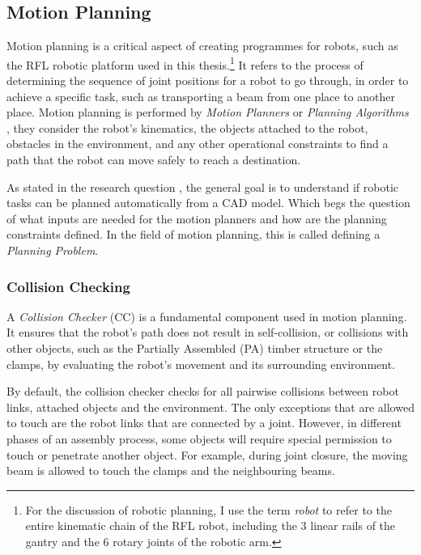 \subsection{Motion Planning}
\label{subsection:exploration-2-motion-planning}

Motion planning is a critical aspect of creating programmes for robots, such as the RFL robotic platform used in this thesis.\footnote{For the discussion of robotic planning, I use the term \textit{robot} to refer to the entire kinematic chain of the RFL robot, including the 3 linear rails of the gantry and the 6 rotary joints of the robotic arm.}
It refers to the process of determining the sequence of joint positions for a robot to go through, in order to achieve a specific task, such as transporting a beam from one place to another place. Motion planning is performed by \textit{Motion Planners} or \textit{Planning Algorithms} \parencite{lavallePlanningAlgorithms2006}, they consider the robot's kinematics, the objects attached to the robot, obstacles in the environment, and any other operational constraints to find a path that the robot can move safely to reach a destination.

As stated in the research question , the general goal is to understand if robotic tasks can be planned automatically from a CAD model. Which begs the question of what inputs are needed for the motion planners and how are the planning constraints defined. In the field of motion planning, this is called defining a \textit{Planning Problem}.

\subsubsection{Collision Checking}
\label{subsubsection:exploration-2-collision-checking}

A \textit{Collision Checker} (CC) is a fundamental component used in motion planning. It ensures that the robot's path does not result in self-collision, or collisions with other objects, such as the Partially Assembled (PA) timber structure or the clamps, by evaluating the robot's movement and its surrounding environment. 

By default, the collision checker checks for all pairwise collisions between robot links, attached objects and the environment. The only exceptions that are allowed to touch are the robot links that are connected by a joint. However, in different phases of an assembly process, some objects will require special permission to touch or penetrate another object. For example, during joint closure, the moving beam is allowed to touch the clamps and the neighbouring beams. 

